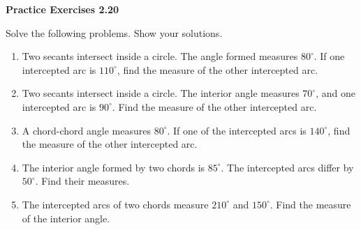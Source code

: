 \vspace{0.3ex}
\noindent\textbf{Practice Exercises 2.20}

\vspace{0.2ex}

Solve the following problems. Show your solutions.

\begin{enumerate}
    \item Two secants intersect inside a circle. The angle formed measures $80^\circ$. If one intercepted arc is $110^\circ$, find the measure of the other intercepted arc.
    \item Two secants intersect inside a circle. The interior angle measures $70^\circ$, and one intercepted arc is $90^\circ$. Find the measure of the other intercepted arc.
    \item A chord-chord angle measures $80^\circ$. If one of the intercepted arcs is $140^\circ$, find the measure of the other intercepted arc.
    \item The interior angle formed by two chords is $85^\circ$. The intercepted arcs differ by $50^\circ$. Find their measures.
    \item The intercepted arcs of two chords measure $210^\circ$ and $150^\circ$. Find the measure of the interior angle.
\end{enumerate}
